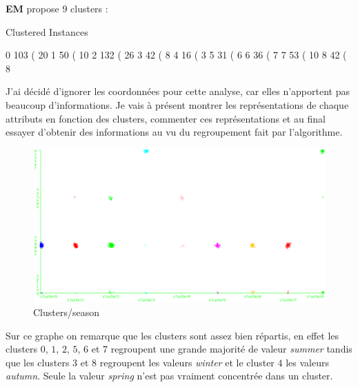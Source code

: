 \documentclass{article}
\begin{document}
\begin{sffamily}
\textbf{EM} propose $9$ clusters :

\begin{center}
	\begin{boxedverbatim}
Clustered Instances

0      103 ( 20%
1       50 ( 10%
2      132 ( 26%
3       42 (  8%
4       16 (  3%
5       31 (  6%
6       36 (  7%
7       53 ( 10%
8       42 (  8%
	\end{boxedverbatim}
\end{center}

J'ai décidé d'ignorer les coordonnées pour cette analyse, car elles n'apportent pas beaucoup d'informations. Je vais à présent montrer les 
représentations de chaque attributs en fonction des clusters, commenter ces représentations et au final essayer d'obtenir des informations au vu du
regroupement fait par l'algorithme.

\begin{figure}[h!]
    \begin{center}
    \includegraphics[width=\textwidth]{img_007.pdf}
    \caption{Clusters/season}
    \end{center}	
\end{figure}

Sur ce graphe on remarque que les clusters sont assez bien répartis, en effet les clusters $0$, $1$, $2$, $5$, $6$ et $7$ regroupent une grande 
majorité de valeur \textit{summer} tandis que les clusters $3$ et $8$ regroupent les valeurs \textit{winter} et le cluster $4$ les valeurs 
\textit{autumn}. Seule la valeur \textit{spring} n'est pas vraiment concentrée dans un cluster.

\newpage


\end{sffamily}
\end{document}
